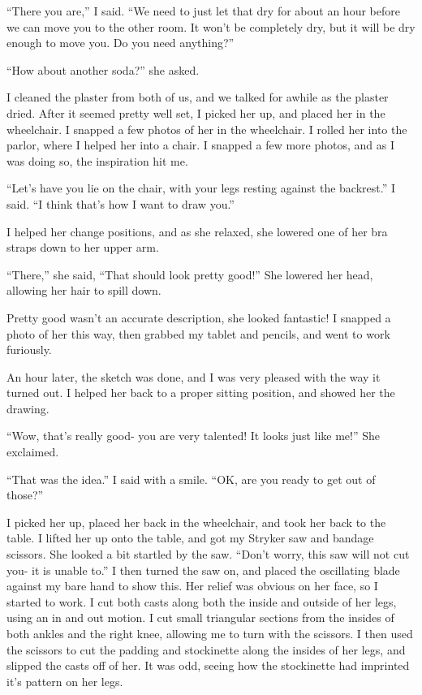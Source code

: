     ``There you are,'' I said. ``We need to just let that dry for about an hour before we can
move you to the other room. It won't be completely dry, but it will be dry enough to move you.
Do you need anything?''

    ``How about another soda?'' she asked.

    I cleaned the plaster from both of us, and we talked for awhile as the plaster dried. After
it seemed pretty well set, I picked her up, and placed her in the wheelchair. I snapped a few
photos of her in the wheelchair. I rolled her into the parlor, where I helped her into a chair.
I snapped a few more photos, and as I was doing so, the inspiration hit me.

    ``Let's have you lie on the chair, with your legs resting against the backrest.'' I said.
``I think that's how I want to draw you.''

    I helped her change positions, and as she relaxed, she lowered one of her bra straps down to
her upper arm.

    ``There,'' she said, ``That should look pretty good!'' She lowered her head, allowing her
hair to spill down.

    Pretty good wasn't an accurate description, she looked fantastic! I snapped a photo of her
this way, then grabbed my tablet and pencils, and went to work furiously.

    An hour later, the sketch was done, and I was very pleased with the way it turned out. I
helped her back to a proper sitting position, and showed her the drawing.

    ``Wow, that's really good- you are very talented! It looks just like me!'' She exclaimed.

    ``That was the idea.'' I said with a smile. ``OK, are you ready to get out of those?''

    I picked her up, placed her back in the wheelchair, and took her back to the table. I lifted
her up onto the table, and got my Stryker saw and bandage scissors. She looked a bit startled by
the saw. ``Don't worry, this saw will not cut you- it is unable to.'' I then turned the saw on,
and placed the oscillating blade against my bare hand to show this. Her relief was obvious on
her face, so I started to work. I cut both casts along both the inside and outside of her legs,
using an in and out motion. I cut small triangular sections from the insides of both ankles and
the right knee, allowing me to turn with the scissors. I then used the scissors to cut the
padding and stockinette along the insides of her legs, and slipped the casts off of her. It was
odd, seeing how the stockinette had imprinted it's pattern on her legs.

